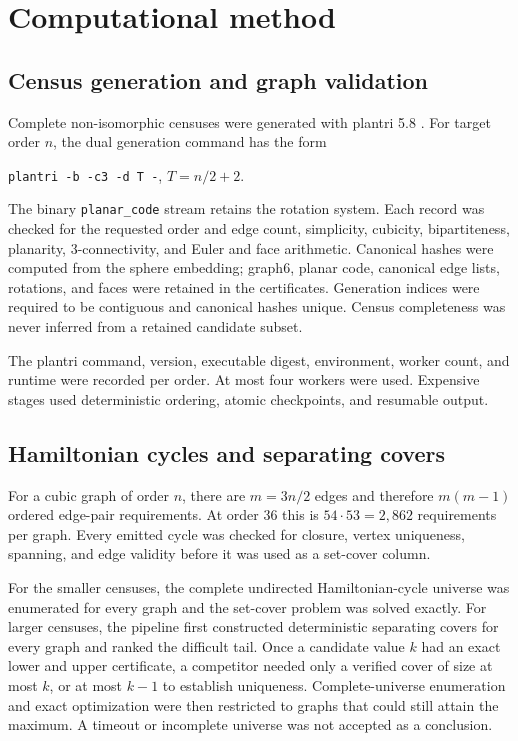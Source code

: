 \section{Computational method}
\label{sec:method}

\subsection{Census generation and graph validation}

Complete non-isomorphic censuses were generated with plantri 5.8
\citep{plantri58}.  For target order \(n\), the dual generation command has the
form
\begin{center}
\texttt{plantri -b -c3 -d T -}, \qquad \(T=n/2+2\).
\end{center}
The binary \texttt{planar\_code} stream retains the rotation system.  Each
record was checked for the requested order and edge count, simplicity,
cubicity, bipartiteness, planarity, 3-connectivity, and Euler and face
arithmetic.  Canonical hashes were computed from the sphere embedding; graph6,
planar code, canonical edge lists, rotations, and faces were retained in the
certificates.  Generation indices were required to be contiguous and canonical
hashes unique.  Census completeness was never inferred from a retained
candidate subset.

The plantri command, version, executable digest, environment, worker count, and
runtime were recorded per order.  At most four workers were used.  Expensive
stages used deterministic ordering, atomic checkpoints, and resumable output.

\subsection{Hamiltonian cycles and separating covers}

For a cubic graph of order \(n\), there are \(m=3n/2\) edges and therefore
\(m(m-1)\) ordered edge-pair requirements.  At order 36 this is
\(54\cdot53=2,862\) requirements per graph.  Every emitted cycle was checked
for closure, vertex uniqueness, spanning, and edge validity before it was used
as a set-cover column.

For the smaller censuses, the complete undirected Hamiltonian-cycle universe
was enumerated for every graph and the set-cover problem was solved exactly.
For larger censuses, the pipeline first constructed deterministic separating
covers for every graph and ranked the difficult tail.  Once a candidate value
\(k\) had an exact lower and upper certificate, a competitor needed only a
verified cover of size at most \(k\), or at most \(k-1\) to establish uniqueness.
Complete-universe enumeration and exact optimization were then restricted to
graphs that could still attain the maximum.  A timeout or incomplete universe
was not accepted as a conclusion.

